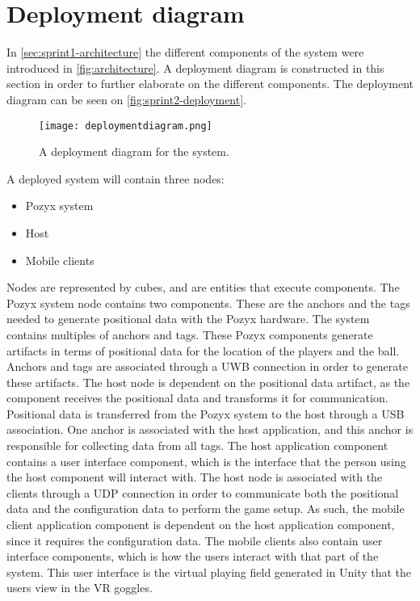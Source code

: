 \section{Deployment diagram}\label{sec:sprint2-deploymentdia}
In \autoref{sec:sprint1-architecture} the different components of the system were introduced in \autoref{fig:architecture}.
A deployment diagram is constructed in this section in order to further elaborate on the different components.
The deployment diagram can be seen on \autoref{fig:sprint2-deployment}.
\begin{figure}[H]
    \centering
    \texttt{[image: deploymentdiagram.png]}
    \caption{A deployment diagram for the system.}
    \label{fig:sprint2-deployment}
\end{figure}
\noindent
A deployed system will contain three nodes:
\begin{itemize}
    \item Pozyx system
    \item Host
    \item Mobile clients
\end{itemize}
Nodes are represented by cubes, and are entities that execute components.
The Pozyx system node contains two components.
These are the anchors and the tags needed to generate positional data with the Pozyx hardware.
The system contains multiples of anchors and tags.
These Pozyx components generate artifacts in terms of positional data for the location of the players and the ball.
Anchors and tags are associated through a UWB connection in order to generate these artifacts.
The host node is dependent on the positional data artifact, as the component receives the positional data and transforms it for communication.
Positional data is transferred from the Pozyx system to the host through a USB association.
One anchor is associated with the host application, and this anchor is responsible for collecting data from all tags.
The host application component contains a user interface component, which is the interface that the person using the host component will interact with.
The host node is associated with the clients through a UDP connection in order to communicate both the positional data and the configuration data to perform the game setup.
As such, the mobile client application component is dependent on the host application component, since it requires the configuration data.
The mobile clients also contain user interface components, which is how the users interact with that part of the system.
This user interface is the virtual playing field generated in Unity that the users view in the VR goggles.
